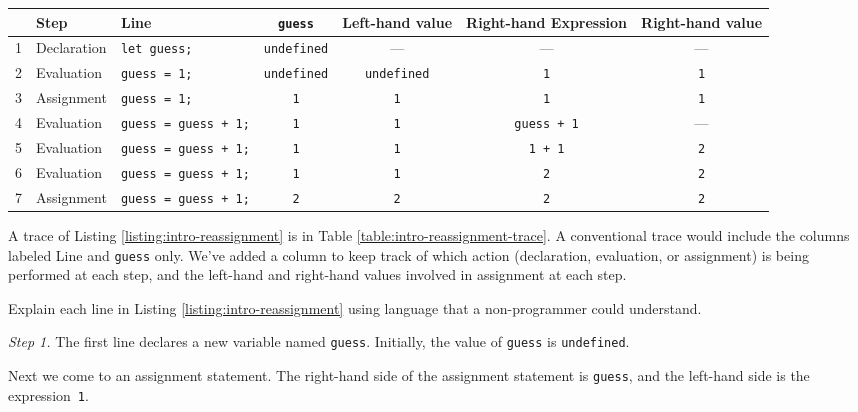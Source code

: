 \begin{table*}
  \small
  \sffamily
  \color{cyan}
  \begin{tabular}{r l | l c|c|c c}
     & Step & Line & \texttt{guess} & Left-hand value & Right-hand Expression & Right-hand value\\
    \hline
    1 & Declaration & \texttt{let guess;} & \texttt{undefined} & --- & --- & --- \\
    2 & Evaluation & \texttt{guess = 1;} & \texttt{undefined} & \texttt{undefined} & \texttt{1} & \texttt{1}\\
    3 & Assignment & \texttt{guess = 1;} & \texttt{1} & \texttt{1} & \texttt{1} & \texttt{1}\\
    4 & Evaluation & \texttt{guess = guess + 1;} & \texttt{1} & \texttt{1} & \texttt{guess + 1} &  --- \\
    5 & Evaluation & \texttt{guess = guess + 1;} & \texttt{1} & \texttt{1} & \texttt{1 + 1} & \texttt{2}\\
    6 & Evaluation & \texttt{guess = guess + 1;} & \texttt{1} & \texttt{1} & \texttt{2} & \texttt{2}\\
    7 & Assignment & \texttt{guess = guess + 1;} & \texttt{2} & \texttt{2} & \texttt{2} & \texttt{2}
  \end{tabular}
  \caption{\label{table:intro-reassignment-trace}A trace of the evaluation and assignment of a variable.}
\end{table*}

A trace of Listing \ref{listing:intro-reassignment} is in Table \ref{table:intro-reassignment-trace}. A conventional trace would include the columns labeled Line and \texttt{guess} only. We've added a column to keep track of which action (declaration, evaluation, or assignment) is being performed at each step, and the left-hand and right-hand values involved in assignment at each step.

\begin{question}
  Explain each line in Listing \ref{listing:intro-reassignment} using language that a non-programmer could understand.
\end{question}

\textit{Step 1.} The first line declares a new variable named \texttt{guess}. Initially, the value of \texttt{guess} is \texttt{undefined}.

Next we come to an assignment statement. The right-hand side of the assignment statement is \texttt{guess}, and the left-hand side is the expression~\texttt{1}.

